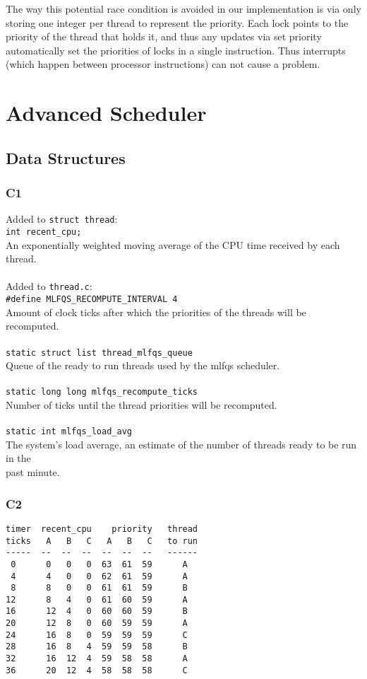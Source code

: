 \documentclass[a4wide, 11pt]{article}
\newcommand{\tab}{\hspace*{2em}}
\newcommand{\tx}{\texttt}
\begin{document}
The way this potential race condition is avoided in our implementation is via only storing one integer per thread to represent the priority. Each lock points to the priority of the thread that holds it, and thus any updates via set priority automatically set the priorities of locks in a single instruction. Thus interrupts (which happen between processor instructions) can not cause a problem.

\section{Advanced Scheduler}
\subsection{Data Structures}
\subsubsection{C1}

Added to \tx{struct thread}: \\
\tab\tab \tx{int recent\_cpu;} \\
\tab\tab An exponentially weighted moving average of the CPU time received by each thread.
\\\\
Added to \tx{thread.c}: \\
\tab\tab \tx{\#define MLFQS\_RECOMPUTE\_INTERVAL 4} \\
\tab\tab Amount of clock ticks after which the priorities of the threads will be recomputed.
\\\\
\tab\tab \tx{static struct list thread\_mlfqs\_queue}\\
\tab\tab Queue of the ready to run threads used by the mlfqs scheduler.
\\\\
\tab\tab \tx{static long long mlfqs\_recompute\_ticks} \\
\tab\tab Number of ticks until the thread priorities will be recomputed.
\\\\
\tab\tab \tx{static int mlfqs\_load\_avg}\\
\tab\tab The system's load average, an estimate of the number of threads ready to be run in the \\
\tab\tab past minute.
\newpage
\subsubsection{C2}
\begin{verbatim}
timer  recent_cpu    priority   thread
ticks   A   B   C   A   B   C   to run
-----  --  --  --  --  --  --   ------
 0      0   0   0  63  61  59      A
 4      4   0   0  62  61  59      A  
 8      8   0   0  61  61  59      B
12      8   4   0  61  60  59      A
16      12  4   0  60  60  59      B
20      12  8   0  60  59  59      A     
24      16  8   0  59  59  59      C
28      16  8   4  59  59  58      B 
32      16  12  4  59  58  58      A        
36      20  12  4  58  58  58      C
\end{verbatim}
\end{document}
